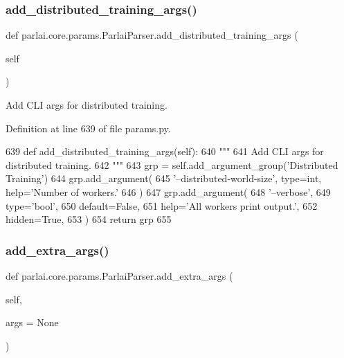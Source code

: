 \subsubsection{\texorpdfstring{add\+\_\+distributed\+\_\+training\+\_\+args()}{add\_distributed\_training\_args()}}
{\footnotesize\ttfamily def parlai.\+core.\+params.\+Parlai\+Parser.\+add\+\_\+distributed\+\_\+training\+\_\+args (\begin{DoxyParamCaption}\item[{}]{self }\end{DoxyParamCaption})}

\begin{DoxyVerb}Add CLI args for distributed training.
\end{DoxyVerb}
 

Definition at line 639 of file params.\+py.


\begin{DoxyCode}
639     \textcolor{keyword}{def }add\_distributed\_training\_args(self):
640         \textcolor{stringliteral}{"""}
641 \textcolor{stringliteral}{        Add CLI args for distributed training.}
642 \textcolor{stringliteral}{        """}
643         grp = self.add\_argument\_group(\textcolor{stringliteral}{'Distributed Training'})
644         grp.add\_argument(
645             \textcolor{stringliteral}{'--distributed-world-size'}, type=int, help=\textcolor{stringliteral}{'Number of workers.'}
646         )
647         grp.add\_argument(
648             \textcolor{stringliteral}{'--verbose'},
649             type=\textcolor{stringliteral}{'bool'},
650             default=\textcolor{keyword}{False},
651             help=\textcolor{stringliteral}{'All workers print output.'},
652             hidden=\textcolor{keyword}{True},
653         )
654         \textcolor{keywordflow}{return} grp
655 
\end{DoxyCode}
\mbox{\label{classparlai_1_1core_1_1params_1_1ParlaiParser_ade9c068595c2b1110d019f3dedeb79ba}} 
\subsubsection{\texorpdfstring{add\+\_\+extra\+\_\+args()}{add\_extra\_args()}}
{\footnotesize\ttfamily def parlai.\+core.\+params.\+Parlai\+Parser.\+add\+\_\+extra\+\_\+args (\begin{DoxyParamCaption}\item[{}]{self,  }\item[{}]{args = {\ttfamily None} }\end{DoxyParamCaption})}


